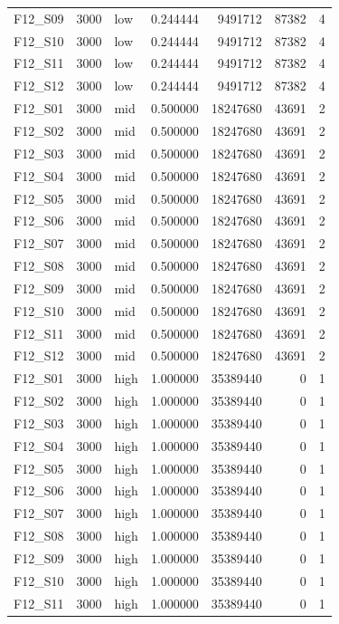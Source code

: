 \begin{longtable}{lllr r r r}
F12\_S09 & 3000 & low & 0.244444 & 9491712 & 87382 & 4 \\
F12\_S10 & 3000 & low & 0.244444 & 9491712 & 87382 & 4 \\
F12\_S11 & 3000 & low & 0.244444 & 9491712 & 87382 & 4 \\
F12\_S12 & 3000 & low & 0.244444 & 9491712 & 87382 & 4 \\
F12\_S01 & 3000 & mid & 0.500000 & 18247680 & 43691 & 2 \\
F12\_S02 & 3000 & mid & 0.500000 & 18247680 & 43691 & 2 \\
F12\_S03 & 3000 & mid & 0.500000 & 18247680 & 43691 & 2 \\
F12\_S04 & 3000 & mid & 0.500000 & 18247680 & 43691 & 2 \\
F12\_S05 & 3000 & mid & 0.500000 & 18247680 & 43691 & 2 \\
F12\_S06 & 3000 & mid & 0.500000 & 18247680 & 43691 & 2 \\
F12\_S07 & 3000 & mid & 0.500000 & 18247680 & 43691 & 2 \\
F12\_S08 & 3000 & mid & 0.500000 & 18247680 & 43691 & 2 \\
F12\_S09 & 3000 & mid & 0.500000 & 18247680 & 43691 & 2 \\
F12\_S10 & 3000 & mid & 0.500000 & 18247680 & 43691 & 2 \\
F12\_S11 & 3000 & mid & 0.500000 & 18247680 & 43691 & 2 \\
F12\_S12 & 3000 & mid & 0.500000 & 18247680 & 43691 & 2 \\
F12\_S01 & 3000 & high & 1.000000 & 35389440 & 0 & 1 \\
F12\_S02 & 3000 & high & 1.000000 & 35389440 & 0 & 1 \\
F12\_S03 & 3000 & high & 1.000000 & 35389440 & 0 & 1 \\
F12\_S04 & 3000 & high & 1.000000 & 35389440 & 0 & 1 \\
F12\_S05 & 3000 & high & 1.000000 & 35389440 & 0 & 1 \\
F12\_S06 & 3000 & high & 1.000000 & 35389440 & 0 & 1 \\
F12\_S07 & 3000 & high & 1.000000 & 35389440 & 0 & 1 \\
F12\_S08 & 3000 & high & 1.000000 & 35389440 & 0 & 1 \\
F12\_S09 & 3000 & high & 1.000000 & 35389440 & 0 & 1 \\
F12\_S10 & 3000 & high & 1.000000 & 35389440 & 0 & 1 \\
F12\_S11 & 3000 & high & 1.000000 & 35389440 & 0 & 1 \\

\end{longtable}
